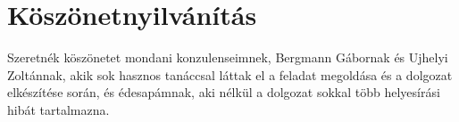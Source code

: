 \chapter*{Köszönetnyilvánítás}%

Szeretnék köszönetet mondani konzulenseimnek, Bergmann Gábornak és Ujhelyi Zoltánnak, akik sok hasznos tanáccsal láttak el a feladat megoldása és a dolgozat elkészítése során, és édesapámnak, aki nélkül a dolgozat sokkal több helyesírási hibát tartalmazna.